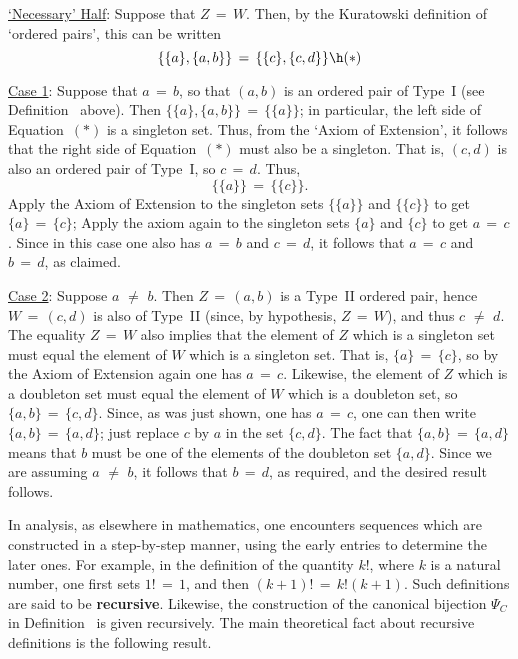 {\V

        \underline{`Necessary' Half}: Suppose that $Z \,=\, W$.
    Then, by the Kuratowski definition of `ordered pairs', this can be written
        \begin{displaymath}
        \{\{a\},\{a,b\}\} \,=\, \{\{c\},\{c,d\}\} \h ({\ast})
        \end{displaymath}

        \underline{Case 1}: Suppose that $a \,=\, b$, so that $(a,b)$ is an ordered pair of Type~I (see Definition~ above).
    Then $\{\{a\},\{a,b\}\} \,=\, \{\{a\}\}$; in particular, the left side of Equation~$({\ast})$ is a singleton set.
    Thus, from the `Axiom of Extension', it follows that the right side of Equation~$({\ast})$ must also be a singleton.
    That is, $(c,d)$ is also an ordered pair of Type~I, so $c \,=\, d$.
    Thus,
        \begin{displaymath}
        \{\{a\}\} \,=\, \{\{c\}\}.
        \end{displaymath}
    Apply the Axiom of Extension to the singleton sets $\{\{a\}\}$ and $\{\{c\}\}$ to get $\{a\} \,=\, \{c\}$;
    Apply the axiom again to the singleton sets $\{a\}$ and $\{c\}$ to get $a \,=\, c$.
    Since in this case one also has $a \,=\, b$ and $c \,=\, d$, it follows that $a \,=\, c$ and $b \,=\, d$, as claimed.

\V

        \underline{Case 2}: Suppose $a \,\,{\neq}\,\, b$. Then $Z \,=\, (a,b)$ is a Type~II ordered pair,
    hence $W \,=\, (c,d)$ is also of Type~II (since, by hypothesis, $Z \,=\, W$), and thus $c \,\,{\neq}\,\, d$.
    The equality $Z \,=\, W$ also implies that the element of $Z$ which is a singleton set must equal the element of $W$ which is a singleton set. That is, $\{a\} \,=\, \{c\}$, so by the Axiom of Extension again one has $a \,=\, c$.
    Likewise, the element of $Z$ which is a doubleton set must equal the element of $W$ which is a doubleton set,
    so $\{a,b\} \,=\, \{c,d\}$. Since, as was just shown, one has $a \,=\, c$, one can then write $\{a,b\} \,=\, \{a,d\}$;
    just replace $c$ by $a$ in the set $\{c,d\}$. The fact that $\{a,b\} \,=\, \{a,d\}$ means that $b$ must be one of the elements of the doubleton set $\{a,d\}$. Since we are assuming $a \,\,{\neq}\,\, b$, it follows that $b \,=\, d$, as required, and the desired result follows.

\VV

        In analysis, as elsewhere in mathematics, one encounters sequences which are constructed in a step-by-step manner,
    using the early entries to determine the later ones. For example, in the definition of the quantity $k!$,
    where $k$ is a natural number, one first sets $1! \,=\, 1$, and then $(k+1)! \,=\, k!(k+1)$.
    Such definitions are said to be {\bf recursive}.
    Likewise, the construction of the canonical bijection ${\Psi}_{C}$ in Definition~ is given recursively.
    The main theoretical fact about recursive definitions is the following result.

}
